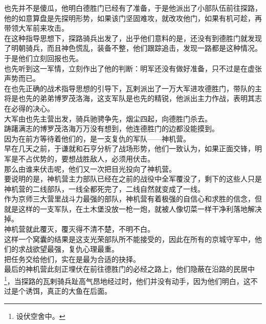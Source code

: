 \begin{multicols}{\theparacolNo}
也先并不是傻瓜，他明白德胜门已经有了准备，于是他派出了小部队伍前往探路，他的如意算盘是先探明形势，如果该门坚固难攻，就改攻他门，如果有机可趁，再带领大军前来攻击。\\

在这种指导思想下，探路骑兵出发了，出乎他们意料的是，还没有到德胜门就发现了明朝骑兵，而且神色慌乱，装备不整，他们跟踪追击，发现一路都是这种情况。于是他们立刻回报也先。\\

也先听到这一军情，立刻作出了他的判断：明军还没有做好准备，只不过是在虚张声势而已。\\

在也先正确的战术指导思想的引导下，瓦剌派出了一万大军进攻德胜门，带队的主将是也先的弟弟博罗茂洛海，这支军队是也先的精锐，他派出主力作战，表明其志在必得的决心。\\

大军由也先主营出发，骑兵驰骋争先，烟尘四起，向德胜门杀去。\\

踌躇满志的博罗茂洛海万万没有想到，他连德胜门的边都没能摸到。\\

因为在前方等待着他们的，是一支复仇的军队——神机营。\\

早在几天之前，于谦就和石亨分析了战场形势，他们一致认为，如果正面交锋，明军是不占优势的，要想战胜敌人，必须用伏击。\\

那么由谁来伏击呢，他们又一次把目光投向了神机营。\\

要说明的是，神机营主力部队已经在之前的战役中全军覆没了，剩下的这些人只是神机营的二线部队，一线全都死完了，二线自然就变成了一线。\\

作为京师三大营里战斗力最强的部队，神机营有着极强的自信心和求胜的信念，但就是这样的一支军队，在土木堡没放一枪一炮，就被人像切菜一样干净利落地解决掉。\\

神机营就此覆灭，覆灭得不清不楚，不明不白。\\

这样一个窝囊的结果是这支光荣部队所不能接受的，因此在所有的京城守军中，他们的求战欲望最强，复仇心理最重。\\

把任务交给他们，实在是最为合适的抉择。\\

最后的神机营此刻正埋伏在前往德胜门的必经之路上，他们隐蔽在沿路的民居中\footnote{设伏空舍中。}，当探路的瓦剌骑兵趾高气昂地经过时，他们并没有动手，因为他们明白，这不过是个诱饵，真正的大鱼在后面。\\


\end{multicols}
